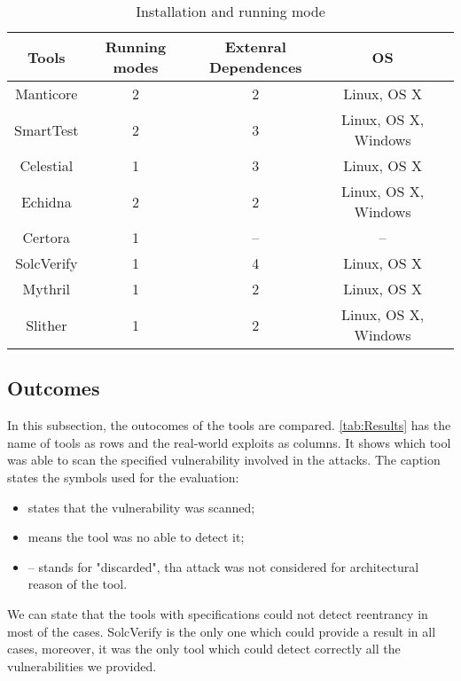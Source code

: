 \begin{center}
    \begin{table*}
        \caption{Installation and running mode}
        \label{tab:Installation}
        \begin{tabular}{ccccc}
        \toprule
            Tools  &  Running modes & Extenral Dependences & OS \\
            \midrule
            Manticore & 2 & 2 & Linux, OS X\\
            SmartTest & 2 & 3 & Linux, OS X, Windows \\
            Celestial & 1 & 3 & Linux, OS X\\
            Echidna & 2 & 2 & Linux, OS X, Windows\\
            Certora & 1 & -- & -- \\ 
            SolcVerify & 1 & 4  &  Linux, OS X \\
            Mythril  & 1 & 2  &  Linux, OS X \\ 
            Slither & 1 & 2 & Linux, OS X, Windows \\   
        \bottomrule
        \end{tabular}
    \end{table*}
\end{center}

\subsection{Outcomes} 
In this subsection, the outocomes of the tools are compared. 
\autoref{tab:Results} has the name of tools as rows and the real-world exploits as columns.
It shows which tool was able to scan the specified vulnerability involved in the attacks. 
The caption states the symbols used for the evaluation:
\begin{itemize}
    \item \checkmark states that the vulnerability was scanned;
    \item \xmark means the tool was no able to detect it;
    \item -- stands for "discarded", tha attack was not considered for architectural reason of the tool.
\end{itemize}


We can state that the tools with specifications could not detect reentrancy in most of the cases. 
SolcVerify is the only one which could provide a result in all cases, moreover, it was the only tool which could detect correctly all the vulnerabilities we provided.

